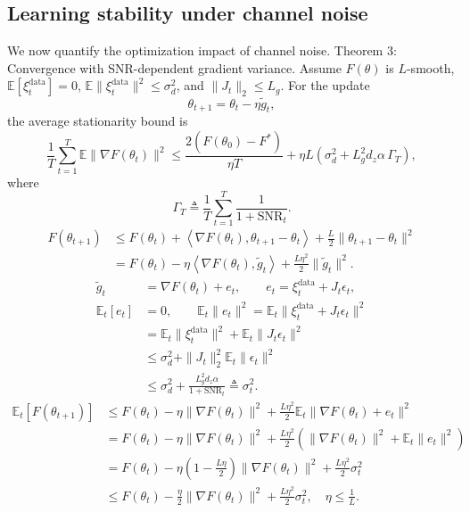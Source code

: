 \documentclass[10pt,journal]{IEEEtran}
\begin{document}
\subsection{Learning stability under channel noise}
We now quantify the optimization impact of channel noise.
Theorem 3: Convergence with SNR-dependent gradient variance.
Assume $F(\theta)$ is $L$-smooth, $\mathbb{E}[\xi_t^{\mathrm{data}}]=0$, $\mathbb{E}\|\xi_t^{\mathrm{data}}\|^2\le\sigma_d^2$, and $\|J_t\|_2\le L_g$. For the update
\begin{equation}
\theta_{t+1} = \theta_t - \eta\tilde{g}_t,
\end{equation}
the average stationarity bound is
\begin{equation}
\frac{1}{T}\sum_{t=1}^{T}\mathbb{E}\|\nabla F(\theta_t)\|^2
\le
\frac{2(F(\theta_0)-F^*)}{\eta T}
+
\eta L\left(
\sigma_d^2
+
L_g^2d_z\alpha\,\Gamma_T
\right),
\end{equation}
where
\begin{equation}
\Gamma_T \triangleq \frac{1}{T}\sum_{t=1}^{T}\frac{1}{1+\mathrm{SNR}_t}.
\end{equation}
\begin{equation}
\begin{aligned}
F(\theta_{t+1})
&\le
F(\theta_t)
+
\left\langle \nabla F(\theta_t),\theta_{t+1}-\theta_t\right\rangle
+
\frac{L}{2}\|\theta_{t+1}-\theta_t\|^2 \\
&=
F(\theta_t)
-
\eta\left\langle \nabla F(\theta_t),\tilde{g}_t\right\rangle
+
\frac{L\eta^2}{2}\|\tilde{g}_t\|^2.
\end{aligned}
\end{equation}
\begin{equation}
\begin{aligned}
\tilde{g}_t
&=
\nabla F(\theta_t)+e_t,
\qquad
e_t = \xi_t^{\mathrm{data}} + J_t\epsilon_t, \\
\mathbb{E}_t[e_t]
&=
0,
\qquad
\mathbb{E}_t\|e_t\|^2
=
\mathbb{E}_t\|\xi_t^{\mathrm{data}}+J_t\epsilon_t\|^2 \\
&=
\mathbb{E}_t\|\xi_t^{\mathrm{data}}\|^2
+
\mathbb{E}_t\|J_t\epsilon_t\|^2 \\
&\le
\sigma_d^2
+
\|J_t\|_2^2\mathbb{E}_t\|\epsilon_t\|^2 \\
&\le
\sigma_d^2
+
\frac{L_g^2 d_z\alpha}{1+\mathrm{SNR}_t}
\triangleq
\sigma_t^2.
\end{aligned}
\end{equation}
\begin{equation}
\begin{aligned}
\mathbb{E}_t\left[F(\theta_{t+1})\right]
&\le
F(\theta_t)
-
\eta\|\nabla F(\theta_t)\|^2
+
\frac{L\eta^2}{2}\mathbb{E}_t\|\nabla F(\theta_t)+e_t\|^2 \\
&=
F(\theta_t)
-
\eta\|\nabla F(\theta_t)\|^2
+
\frac{L\eta^2}{2}
\left(\|\nabla F(\theta_t)\|^2+\mathbb{E}_t\|e_t\|^2\right) \\
&=
F(\theta_t)
-
\eta\left(1-\frac{L\eta}{2}\right)\|\nabla F(\theta_t)\|^2
+
\frac{L\eta^2}{2}\sigma_t^2 \\
&\le
F(\theta_t)
-
\frac{\eta}{2}\|\nabla F(\theta_t)\|^2
+
\frac{L\eta^2}{2}\sigma_t^2,
\quad \eta\le \frac{1}{L}.
\end{aligned}
\end{equation}
\end{document}
